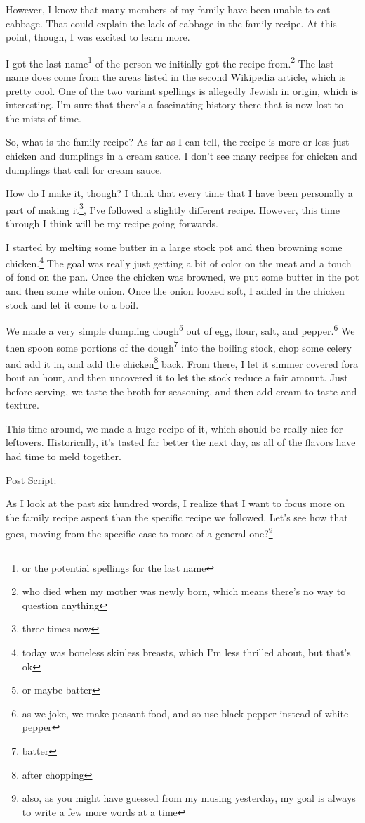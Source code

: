 \documentclass[12pt]{article}[titlepage]
\newcommand{\1}{\={a}}
\newcommand{\2}{\={e}}
\newcommand{\3}{\={\i}}
\newcommand{\4}{\=o}
\newcommand{\5}{\=u}
\newcommand{\6}{\={A}}
\renewcommand{\,}{\textsuperscript{,}}
\begin{document}
However, I know that many members of my family have been unable to eat cabbage.
That could explain the lack of cabbage in the family recipe.
At this point, though, I was excited to learn more.

I got the last name\footnote{or the potential spellings for the last name} of the person we initially got the recipe from.\footnote{who died when my mother was newly born, which means there's no way to question anything}
The last name does come from the areas listed in the second Wikipedia article, which is pretty cool.
One of the two variant spellings is allegedly Jewish in origin, which is interesting.
I'm sure that there's a fascinating history there that is now lost to the mists of time.

So, what is the family recipe?
As far as I can tell, the recipe is more or less just chicken and dumplings in a cream sauce.
I don't see many recipes for chicken and dumplings that call for cream sauce.

How do I make it, though?
I think that every time that I have been personally a part of making it\footnote{three times now}, I've followed a slightly different recipe.
However, this time through I think will be my recipe going forwards.

I started by melting some butter in a large stock pot and then browning some chicken.\footnote{today was boneless skinless breasts, which I'm less thrilled about, but that's ok}
The goal was really just getting a bit of color on the meat and a touch of fond on the pan.
Once the chicken was browned, we put some butter in the pot and then some white onion.
Once the onion looked soft, I added in the chicken stock and let it come to a boil.

We made a very simple dumpling dough\footnote{or maybe batter} out of egg, flour, salt, and pepper.\footnote{as we joke, we make peasant food, and so use black pepper instead of white pepper}
We then spoon some portions of the dough\footnote{batter} into the boiling stock, chop some celery and add it in, and add the chicken\footnote{after chopping} back.
From there, I let it simmer covered fora bout an hour, and then uncovered it to let the stock reduce a fair amount.
Just before serving, we taste the broth for seasoning, and then add cream to taste and texture.

This time around, we made a huge recipe of it, which should be really nice for leftovers.
Historically, it's tasted far better the next day, as all of the flavors have had time to meld together.

Post Script:

As I look at the past six hundred words, I realize that I want to focus more on the family recipe aspect than the specific recipe we followed.
Let's see how that goes, moving from the specific case to more of a general one?\footnote{also, as you might have guessed from my musing yesterday, my goal is always to write a few more words at a time}
\end{document}

